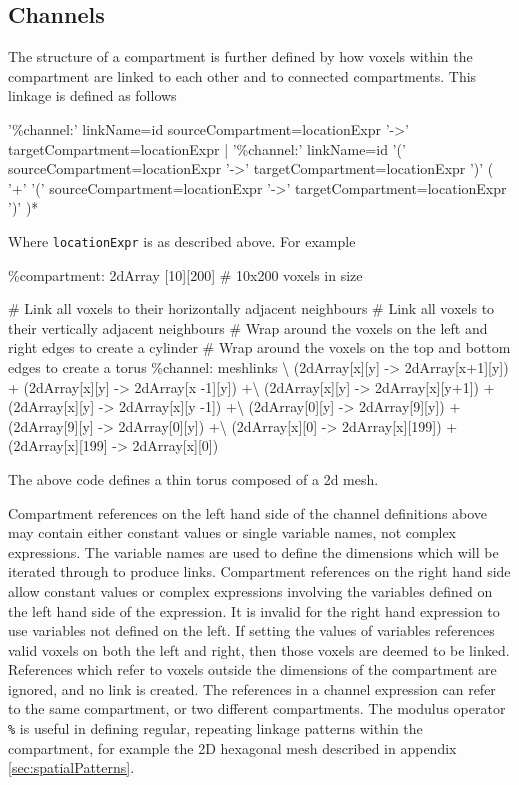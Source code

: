 \subsection{Channels}

The structure of a compartment is further defined by how voxels within the compartment are linked to each other and to connected compartments. This linkage is defined as follows
\begin{bnfsource}
'\%channel:' linkName=id sourceCompartment=locationExpr '->' targetCompartment=locationExpr
| '\%channel:' linkName=id 
    '(' sourceCompartment=locationExpr '->' targetCompartment=locationExpr ')'
    ( '+' '(' sourceCompartment=locationExpr '->' targetCompartment=locationExpr ')' )* 
\end{bnfsource}
Where \verb|locationExpr| is as described above. For example
\begin{kappasource}
\%compartment: 2dArray [10][200]    # 10x200 voxels in size 

# Link all voxels to their horizontally adjacent neighbours
# Link all voxels to their vertically adjacent neighbours
# Wrap around the voxels on the left and right edges to create a cylinder
# Wrap around the voxels on the top and bottom edges to create a torus
\%channel: meshlinks {\textbackslash}
    (2dArray[x][y] -> 2dArray[x+1][y]) + (2dArray[x][y] -> 2dArray[x -1][y]) +{\textbackslash}
    (2dArray[x][y] -> 2dArray[x][y+1]) + (2dArray[x][y] -> 2dArray[x][y -1]) +{\textbackslash}
    (2dArray[0][y] -> 2dArray[9][y])   + (2dArray[9][y] -> 2dArray[0][y]) +{\textbackslash}
    (2dArray[x][0] -> 2dArray[x][199]) + (2dArray[x][199] -> 2dArray[x][0])
\end{kappasource}

The above code defines a thin torus composed of a 2d mesh.

Compartment references on the left hand side of the channel definitions above may contain either constant values or single variable names, not complex expressions. The variable names are used to define the dimensions which will be iterated through to produce links. Compartment references on the right hand side allow constant values or complex expressions involving the variables defined on the left hand side of the expression. It is invalid for the right hand expression to use variables not defined on the left. If setting the values of variables references valid voxels on both the left and right, then those voxels are deemed to be linked. References which refer to voxels outside the dimensions of the compartment are ignored, and no link is created. The references in a channel expression can refer to the same compartment, or two different compartments. The modulus operator \verb|%| is useful in defining regular, repeating linkage patterns within the compartment, for example the 2D hexagonal mesh described in appendix \ref{sec:spatialPatterns}.

